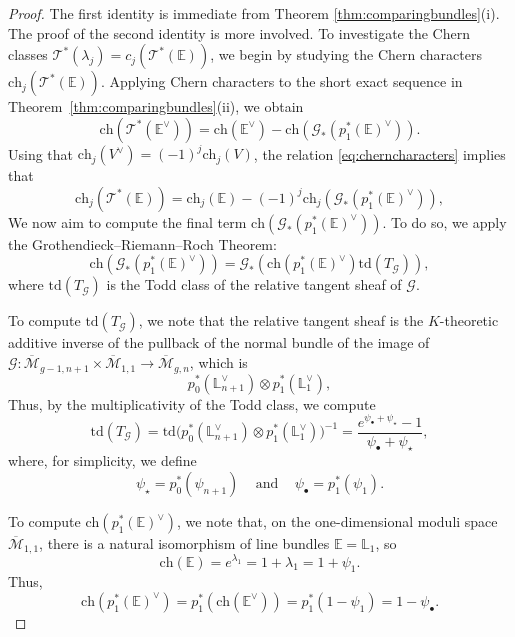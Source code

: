\documentclass[12pt]{amsart}
\theoremstyle{definition}
\newcommand{\M}{\overline{\mathcal{M}}}
\newcommand{\T}{\mathcal{T}}
\newcommand{\bE}{\mathbb{E}}
\newcommand{\G}{\mathcal{G}}
\newcommand{\ch}{\mathrm{ch}}
\renewcommand{\L}{\mathbb{L}}
\newcommand{\td}{\mathrm{td}}
\numberwithin{equation}{section}
\begin{document}
\begin{proof}

The first identity is immediate from Theorem \ref{thm:comparingbundles}(i). The proof of the second identity is more involved. To investigate the Chern classes $\T^*(\lambda_j)=c_j(\T^*(\bE))$, we begin by studying the Chern characters $\ch_j(\T^*(\bE))$. Applying Chern characters to the short exact sequence in Theorem~\ref{thm:comparingbundles}(ii), we obtain
\begin{equation}\label{eq:cherncharacters}
\ch(\T^*(\bE^\vee))=\ch(\bE^\vee)-\ch(\G_*(p_1^*(\bE)^\vee)).
\end{equation}
Using that $\ch_j(V^\vee)=(-1)^j\ch_j(V)$, the relation \eqref{eq:cherncharacters} implies that
\begin{equation}\label{eq:cherncharacter1}
\ch_j(\T^*(\bE))=\ch_j(\bE)-(-1)^j\ch_j(\G_*(p_1^*(\bE)^\vee)),
\end{equation}
We now aim to compute the final term $\ch(\G_*(p_1^*(\bE)^\vee))$. To do so, we apply the Grothendieck--Riemann--Roch Theorem:
\[
\ch(\G_*(p_1^*(\bE)^\vee))=\G_*(\ch(p_1^*(\bE)^\vee)\td(T_\G)),
\]
where $\td(T_\G)$ is the Todd class of the relative tangent sheaf of $\G$. 

To compute $\td(T_\G)$, we note that the relative tangent sheaf is the $K$-theoretic additive inverse of the pullback of the normal bundle of the image of $\G:\M_{g-1,n+1}\times\M_{1,1}\rightarrow\M_{g,n}$, which is
\[
p_0^*(\L_{n+1}^\vee)\otimes p_1^*(\L_1^\vee),
\]
Thus, by the multiplicativity of the Todd class, we compute
\[
\td(T_\G)=\td\big(p_0^*(\L_{n+1}^\vee)\otimes p_1^*(\L_1^\vee)\big)^{-1}=\frac{e^{\psi_\bullet+\psi_\star}-1}{\psi_\bullet+\psi_\star}, 
\]
where, for simplicity, we define
\[
\psi_\star=p_0^*(\psi_{n+1})\;\;\;\text{ and }\;\;\;\psi_\bullet=p_1^*(\psi_1).
\]

To compute $\ch(p_1^*(\bE)^\vee)$, we note that, on the one-dimensional moduli space $\M_{1,1}$, there is a natural isomorphism of line bundles $\bE=\L_1$, so
\[
\ch(\bE)=e^{\lambda_1}=1+\lambda_1=1+\psi_1.
\]
Thus, 
\[
\ch(p_1^*(\bE)^\vee)=p_1^*(\ch(\bE^\vee))=p_1^*(1-\psi_1)=1-\psi_\bullet.
\]


\end{proof}
\end{document}
